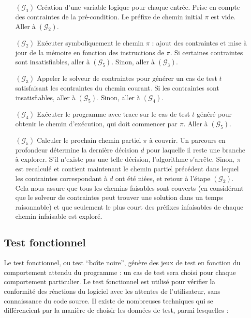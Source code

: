 \begin{itemize}
\item[$(\mathcal{G}_1)$]
Création d'une variable logique pour chaque entrée.
Prise en compte des contraintes de la pré-condition.
Le préfixe de chemin initial $\pi$ est vide.
Aller à $(\mathcal{G}_2)$.

\item[$(\mathcal{G}_2)$]
Exécuter symboliquement le chemin $\pi$ : ajout des contraintes et
mise à jour de la mémoire en fonction des instructions de $\pi$.
Si certaines contraintes sont insatisfiables, aller à $(\mathcal{G}_5)$.
Sinon, aller à $(\mathcal{G}_3)$.

\item[$(\mathcal{G}_3)$]
Appeler le solveur de contraintes pour générer un cas de test $t$ satisfaisant
les contraintes du chemin courant. Si les contraintes sont insatisfiables, aller
à $(\mathcal{G}_5)$.
Sinon, aller à $(\mathcal{G}_4)$.

\item[$(\mathcal{G}_4)$]
Exécuter le programme avec trace sur le cas de test $t$ généré pour obtenir
le chemin d'exécution, qui doit commencer par $\pi$.
Aller à $(\mathcal{G}_5)$.

\item[$(\mathcal{G}_5)$]
Calculer le prochain chemin partiel $\pi$ à couvrir. Un parcours en profondeur
détermine la dernière décision $d$ pour laquelle il reste une branche à
explorer. S'il n'existe pas une telle décision, l'algorithme s'arrête. Sinon,
$\pi$ est recalculé et contient maintenant le chemin partiel précédent dans
lequel les contraintes correspondant à $d$ ont été niées, et retour à l'étape
$(\mathcal{G}_2)$. Cela nous assure que tous les chemins faisables sont couverts
(en considérant que le solveur de contraintes peut trouver une solution dans un
temps raisonnable) et que seulement le plus court des préfixes infaisables de
chaque chemin infaisable est exploré.
\end{itemize}



\subsection{Test fonctionnel}
\label{sec:test-fonctionnel}

Le test fonctionnel, ou test ``boîte noire'', génère des jeux de test en
fonction du comportement attendu du programme : un cas de test sera choisi pour
chaque comportement particulier. Le test fonctionnel est utilisé pour vérifier
la conformité des réactions du logiciel avec les attentes de l'utilisateur, sans
connaissance du code source. Il existe de nombreuses techniques qui se
différencient par la manière de choisir les données de test, parmi lesquelles :


